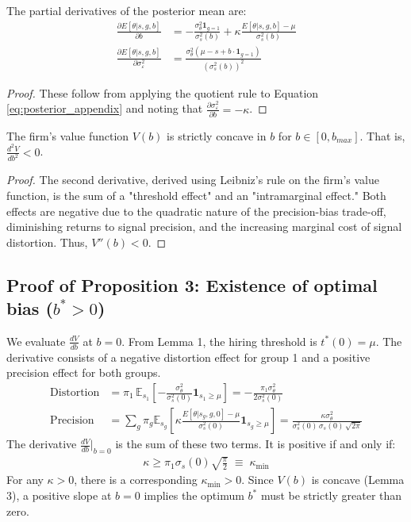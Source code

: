 \begin{lemma}
The partial derivatives of the posterior mean are:
\begin{align}
\frac{\partial E[\theta | s, g, b]}{\partial b} &= -\frac{\sigma_\theta^2 \mathbf{1}_{g=1}}{\sigma_s^2(b)} + \kappa \frac{E[\theta|s,g,b] - \mu}{\sigma_s^2(b)} \\
\frac{\partial E[\theta | s, g, b]}{\partial \sigma_\varepsilon^2} &= \frac{\sigma_\theta^2(\mu - s + b \cdot \mathbf{1}_{g=1})}{(\sigma_s^2(b))^2}
\end{align}
\end{lemma}
\begin{proof}
These follow from applying the quotient rule to Equation \ref{eq:posterior_appendix} and noting that $\frac{\partial \sigma_\varepsilon^2}{\partial b} = -\kappa$.
\end{proof}

\begin{lemma}
The firm's value function $V(b)$ is strictly concave in $b$ for $b \in [0, b_{max}]$. That is, $\frac{d^2V}{db^2} < 0$.
\end{lemma}
\begin{proof}
The second derivative, derived using Leibniz's rule on the firm's value function, is the sum of a "threshold effect" and an "intramarginal effect." Both effects are negative due to the quadratic nature of the precision-bias trade-off, diminishing returns to signal precision, and the increasing marginal cost of signal distortion. Thus, $V''(b) < 0$.
\end{proof}

\subsection{Proof of Proposition 3: Existence of optimal bias ($b^* > 0$)}

We evaluate $\frac{dV}{db}$ at $b=0$. From Lemma 1, the hiring threshold is $t^*(0)=\mu$. The derivative consists of a negative distortion effect for group 1 and a positive precision effect for both groups.
\begin{align}
\text{Distortion} &= \pi_1 \, \mathbb{E}_{s_1}\left[-\frac{\sigma_\theta^2}{\sigma_s^2(0)} \mathbf{1}_{s_1 \ge \mu}\right] = -\frac{\pi_1 \sigma_\theta^2}{2\sigma_s^2(0)} \\
\text{Precision} &= \sum_g \pi_g \mathbb{E}_{s_g}\left[ \kappa \frac{E[\theta|s_g,g,0]-\mu}{\sigma_s^2(0)} \mathbf{1}_{s_g \ge \mu} \right] = \frac{\kappa \sigma_\theta^2}{\sigma_s^2(0)\,\sigma_s(0)\,\sqrt{2\pi}}
\end{align}
The derivative $\frac{dV}{db}\Big|_{b=0}$ is the sum of these two terms. It is positive if and only if:
\begin{align}
\kappa \geq \pi_1 \sigma_s(0) \sqrt{\tfrac{\pi}{2}} \;\equiv\; \kappa_{\min}
\end{align}
For any $\kappa > 0$, there is a corresponding $\kappa_{\min}>0$. Since $V(b)$ is concave (Lemma 3), a positive slope at $b=0$ implies the optimum $b^*$ must be strictly greater than zero.


